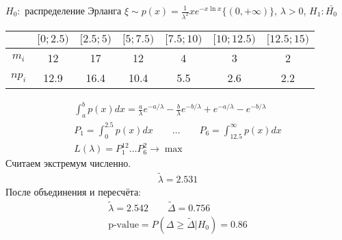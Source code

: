 \documentclass{article}
\begin{document}
\begin{eg}
  $H_0:$ распределение Эрланга $\xi \sim p(x)=\frac{1}{\lambda^{2}}x e^{-x\ln x}\{(0, +\infty)\}$,
  $\lambda > 0$, $H_1:\bar{H_0}$
  \begin{center}
  \begin{tabular}{| c | c | c | c | c | c | c |}
    \hline
    & $[0;2.5)$ &$[2.5; 5)$ &$[5; 7.5)$ &$[7.5;10)$ &$[10; 12.5)$ & $[12.5; 15)$ \\ 
    \hline
    $m_i$ & 12 & 17 & 12 & 4 & 3 & 2\\
    \hline
    $np_i$ & 12.9 & 16.4 & 10.4 & 5.5 & 2.6 & 2.2 \\ 
    \hline
  \end{tabular}
  \end{center}
  \begin{gather*}
    \int_{a}^{b}p(x)dx=\frac{a}{\lambda}e^{-a/\lambda}-\frac{b}{\lambda}e^{-b/\lambda}+e^{-a/\lambda}-e^{-b/\lambda} \\ 
    P_1=\int_{0}^{2.5}p(x)dx \qquad \dots \qquad P_6=\int_{12.5}^{\infty}p(x)dx \\ 
    L(\lambda)=P_1^{12}\dots P_6^{2} \to \max
  \end{gather*}
  Считаем экстремум численно.
  \begin{gather*}
    \tilde{\lambda}=2.531
  \end{gather*}
  После объединения и пересчёта:
  \begin{gather*}
    \tilde{\lambda}=2.542 \qquad \tilde{\Delta}=0.756 \\ 
    \text{p-value}=P(\Delta \ge \tilde{\Delta}|H_0)=0.86
  \end{gather*}
\end{eg}
\end{document}
